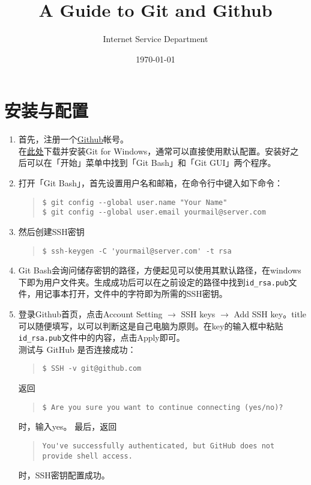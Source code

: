 \documentclass{article}
\title{A Guide to Git and Github}
\author{Internet Service Department}
\date{\today}
\begin{document}
	\maketitle
	\tableofcontents
	\newpage
	\section{安装与配置} %
	\label{sec:安装与配置}
		\begin{enumerate}
			\item 首先，注册一个\href{http://github.com/}{Github}帐号。
			\\在\href{http://msysgit.github.io/}{此处}下载并安装Git for Windows，通常可以直接使用默认配置。安装好之后可以在「开始」菜单中找到「Git Bash」和「Git GUI」两个程序。
			\item 打开「Git Bash」，首先设置用户名和邮箱，在命令行中键入如下命令：
			\begin{quote}
				\begin{lstlisting}
$ git config --global user.name "Your Name"
$ git config --global user.email yourmail@server.com
				\end{lstlisting}
			\end{quote}
			\item 然后创建SSH密钥
			\begin{quote}
				\begin{lstlisting}
$ ssh-keygen -C 'yourmail@server.com' -t rsa
				\end{lstlisting}
			\end{quote}
			\item Git Bash会询问储存密钥的路径，方便起见可以使用其默认路径，在windows下即为用户文件夹。生成成功后可以在之前设定的路径中找到{\tt id\_rsa.pub}文件，用记事本打开，文件中的字符即为所需的SSH密钥。
			\item 登录Github首页，点击Account Setting $\to$ SSH keys $\to$ Add SSH key。title可以随便填写，以可以判断这是自己电脑为原则。在key的输入框中粘贴{\tt id\_rsa.pub}文件中的内容，点击Apply即可。
			\\测试与 GitHub 是否连接成功：
			\begin{quote}
				\begin{lstlisting}
$ SSH -v git@github.com
				\end{lstlisting}
			\end{quote}
			返回
			\begin{quote}
				\begin{lstlisting}
$ Are you sure you want to continue connecting (yes/no)?
				\end{lstlisting}
			\end{quote}
			时，输入yes。
			最后，返回
			\begin{quote}
				\begin{lstlisting}
You've successfully authenticated, but GitHub does not provide shell access.
				\end{lstlisting}
			\end{quote}
			时，SSH密钥配置成功。
		\end{enumerate}
\end{document}
